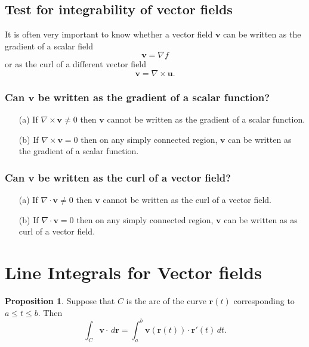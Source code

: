 \documentclass[12pt, a4paper]{article}
\newcommand{\mb}[1]{\mathbf{#1}}
\theoremstyle{definition}
\newtheorem{proposition}{Proposition}
\theoremstyle{plain}
\begin{document}
\subsection{Test for integrability of vector fields}

It is often very important to know whether a vector field $\mb{v}$ can be written as the gradient of a scalar field $$\mb{v}=\nabla f$$ or as the curl of a different vector field $$\mb{v}=\nabla \times \mb{u}.$$

\subsubsection{Can \texorpdfstring{$\mb{v}$}{TEXT} be written as the gradient of a scalar function?}

\begin{enumerate}
	
	\item[(a)] If $\nabla\times \mb{v} \neq0$ then $\mb{v}$ cannot be written as the gradient of a scalar function.

	\item[(b)] If $\nabla \times \mb{v} = 0$ then on any simply connected region, $\mb{v}$ can be written as the gradient of a scalar function.

\end{enumerate}

\subsubsection{Can \texorpdfstring{$\mb{v}$}{TEXT} be written as the curl of a vector field?}

\begin{enumerate}
	
	\item[(a)] If $\nabla\cdot \mb{v} \neq0$ then $\mb{v}$ cannot be written as the curl of a vector field.

	\item[(b)] If $\nabla \cdot \mb{v} = 0$ then on any simply connected region, $\mb{v}$ can be written as as curl of a vector field.

\end{enumerate}

\section{Line Integrals for Vector fields}

\begin{proposition}
Suppose that $C$ is the arc of the curve $\mb{r}(t)$ corresponding to $a \leq t \leq b.$ Then $$\int_C \mb{v}\cdot \,d\mb{r}=\int_{a}^{b} \mb{v}(\mb{r}(t))\cdot\mb{r'}(t)\,dt.$$
\end{proposition}
\end{document}
